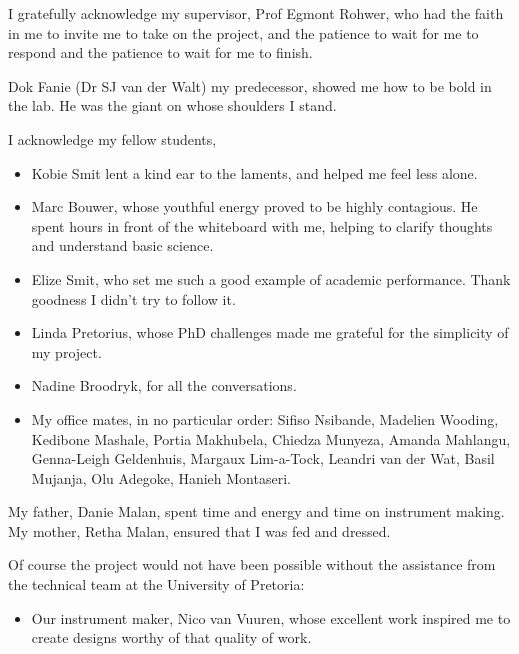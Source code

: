 \documentclass[
11pt, %
english, %
singlespacing, %
headsepline, %
]{MastersDoctoralThesis} %
\begin{document}
\begin{acknowledgements}
\addchaptertocentry{\acknowledgementname} %

I gratefully acknowledge my supervisor, Prof Egmont Rohwer, who had the faith in
me to invite me to take on the project, and the patience to wait for me to
respond and the patience to wait for me to finish. 

Dok Fanie (Dr SJ van der Walt) my predecessor, showed me how to be bold in the
lab. He was the giant on whose shoulders I stand.

I acknowledge my fellow students,
\begin{itemize} 
  
\item Kobie Smit lent a kind ear to the laments, and helped me feel less alone.

\item Marc Bouwer, whose youthful energy proved to be highly contagious. He
spent hours in front of the whiteboard with me, helping to clarify thoughts and
understand basic science.

\item Elize Smit, who set me such a good example of academic performance. Thank
goodness I didn't try to follow it.
 
\item Linda Pretorius, whose PhD challenges made me grateful for the simplicity
of my project.

\item Nadine Broodryk, for all the conversations.

\item My office mates, in no particular order: Sifiso Nsibande, Madelien
Wooding, Kedibone Mashale, Portia Makhubela, Chiedza Munyeza, Amanda Mahlangu,
Genna-Leigh Geldenhuis, Margaux Lim-a-Tock, Leandri van der Wat, Basil Mujanja,
Olu Adegoke, Hanieh Montaseri.

\end{itemize}

My father, Danie Malan, spent time and energy and time on instrument making. My
mother, Retha Malan, ensured that I was fed and dressed. 

Of course the project would not have been possible without the assistance from
the technical team at the University of Pretoria:

\begin{itemize}
\item Our instrument maker, Nico van Vuuren, whose excellent work inspired me to
create designs worthy of that quality of work.


\end{itemize}
\end{acknowledgements}
\end{document}
